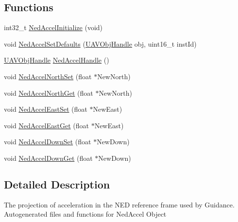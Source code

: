 \subsection*{\-Functions}
\begin{DoxyCompactItemize}
\item 
int32\-\_\-t \hyperlink{group___ned_accel_ga65aecf7d6fd2c6d5215a508cf83a9050}{\-Ned\-Accel\-Initialize} (void)
\item 
void \hyperlink{group___ned_accel_ga667473c0afb98f9e1dd90b827bb77758}{\-Ned\-Accel\-Set\-Defaults} (\hyperlink{targets_2_u_a_v_objects_2inc_2uavobjectmanager_8h_a279053e22be53ce9f895043aaeb91e3b}{\-U\-A\-V\-Obj\-Handle} obj, uint16\-\_\-t inst\-Id)
\item 
\hyperlink{targets_2_u_a_v_objects_2inc_2uavobjectmanager_8h_a279053e22be53ce9f895043aaeb91e3b}{\-U\-A\-V\-Obj\-Handle} \hyperlink{group___ned_accel_ga99d5b004039fa357b8d716a5c122f8c2}{\-Ned\-Accel\-Handle} ()
\item 
void \hyperlink{group___ned_accel_ga59dafaf25a7d395f67d448f42014dd0f}{\-Ned\-Accel\-North\-Set} (float $\ast$\-New\-North)
\item 
void \hyperlink{group___ned_accel_ga47593eab179a3799381dae893e59b021}{\-Ned\-Accel\-North\-Get} (float $\ast$\-New\-North)
\item 
void \hyperlink{group___ned_accel_ga4ad4b39594a267af0de3758a6ae1f117}{\-Ned\-Accel\-East\-Set} (float $\ast$\-New\-East)
\item 
void \hyperlink{group___ned_accel_ga1da9a5e00814872683e3b8367a31bcad}{\-Ned\-Accel\-East\-Get} (float $\ast$\-New\-East)
\item 
void \hyperlink{group___ned_accel_ga575209f8e444f67be97f84587e01a4ce}{\-Ned\-Accel\-Down\-Set} (float $\ast$\-New\-Down)
\item 
void \hyperlink{group___ned_accel_ga2f0dc48250b533085615013e266979aa}{\-Ned\-Accel\-Down\-Get} (float $\ast$\-New\-Down)
\end{DoxyCompactItemize}


\subsection{\-Detailed \-Description}
\-The projection of acceleration in the \-N\-E\-D reference frame used by \-Guidance. \-Autogenerated files and functions for \-Ned\-Accel \-Object 

